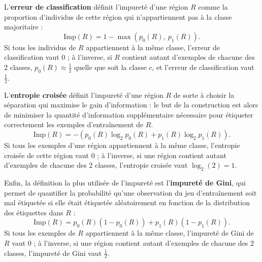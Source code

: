 L'\textbf{erreur de classification} définit l'impureté
d'une région $R$ comme la proportion d'individus de cette région qui
n'appartiennent pas à la classe majoritaire :
\begin{equation}
  \label{eq:impurity_error}
  \text{Imp}(R) = 1 - \max (p_0(R),~p_1(R)).
\end{equation}
Si tous les individus de $R$ appartiennent à la même classe, l'erreur de
classification vaut $0$ ; à l'inverse, si $R$ contient autant d'exemples de
chacune des 2 classes, $p_0(R) \approx \frac12$ quelle que soit la classe
$c$, et l'erreur de classification vaut $\frac12.$

L'\textbf{entropie croisée} définit l'impureté d'une région $R$ de
sorte à choisir la séparation qui maximise le gain d'information : le but de la
construction est alors de minimiser la quantité d'information supplémentaire
nécessaire pour étiqueter correctement les exemples d'entraînement de $R$.
\begin{equation}
  \label{eq:impurity_entropy}
  \text{Imp}(R) = - \left(p_0(R) \log_2 p_0(R) + p_1(R) \log_2 p_1(R)\right).
\end{equation}
Si tous les exemples d'une région appartiennent à la même classe, l'entropie
croisée de cette région vaut $0$ ; à l'inverse, si une région contient autant
d'exemples de chacune des 2 classes, l'entropie croisée vaut $\log_2(2)=1.$
  
Enfin, la définition la plus utilisée de l'impureté est l'\textbf{impureté de
  Gini}, qui permet de quantifier la probabilité qu'une observation du jeu
d'entraînement soit mal étiquetée si elle était étiquetée aléatoirement en
fonction de la distribution des étiquettes dans $R$ :
\begin{equation*}
  \text{Imp}(R) = p_0(R) \left(1 - p_0(R)\right) + p_1(R) \left(1 - p_1(R)\right).
\end{equation*}
Si tous les exemples de $R$ appartiennent à la même classe, l'impureté de
Gini de $R$ vaut $0$ ; à l'inverse, si une région contient autant
d'exemples de chacune des 2 classes, l'impureté de Gini vaut $\frac12.$ 




